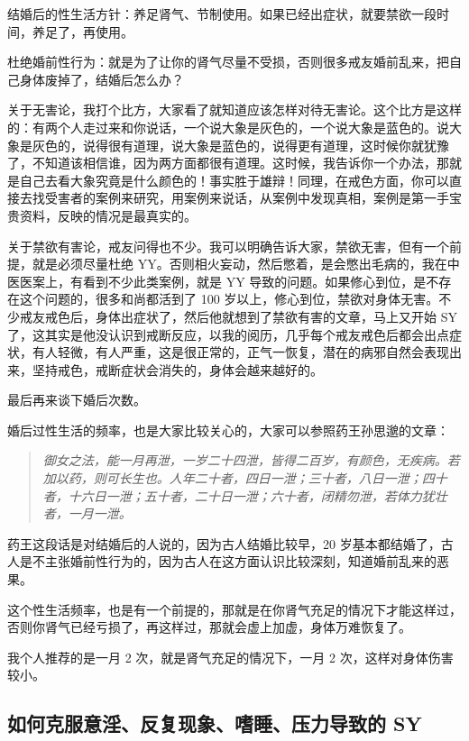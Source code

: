 \documentclass{ctexart}
\begin{document}
结婚后的性生活方针：养足肾气、节制使用。如果已经出症状，就要禁欲一段时间，养足了，再使用。

杜绝婚前性行为：就是为了让你的肾气尽量不受损，否则很多戒友婚前乱来，把自己身体废掉了，结婚后怎么办？

关于无害论，我打个比方，大家看了就知道应该怎样对待无害论。这个比方是这样的：有两个人走过来和你说话，一个说大象是灰色的，一个说大象是蓝色的。说大象是灰色的，说得很有道理，说大象是蓝色的，说得更有道理，这时候你就犹豫了，不知道该相信谁，因为两方面都很有道理。这时候，我告诉你一个办法，那就是自己去看大象究竟是什么颜色的！事实胜于雄辩！同理，在戒色方面，你可以直接去找受害者的案例来研究，用案例来说话，从案例中发现真相，案例是第一手宝贵资料，反映的情况是最真实的。

关于禁欲有害论，戒友问得也不少。我可以明确告诉大家，禁欲无害，但有一个前提，就是必须尽量杜绝 YY。否则相火妄动，然后憋着，是会憋出毛病的，我在中医医案上，有看到不少此类案例，就是 YY 导致的问题。如果修心到位，是不存在这个问题的，很多和尚都活到了 100 岁以上，修心到位，禁欲对身体无害。不少戒友戒色后，身体出症状了，然后他就想到了禁欲有害的文章，马上又开始 SY 了，这其实是他没认识到戒断反应，以我的阅历，几乎每个戒友戒色后都会出点症状，有人轻微，有人严重，这是很正常的，正气一恢复，潜在的病邪自然会表现出来，坚持戒色，戒断症状会消失的，身体会越来越好的。

最后再来谈下婚后次数。

婚后过性生活的频率，也是大家比较关心的，大家可以参照药王孙思邈的文章：

\begin{quote}\it
    御女之法，能一月再泄，一岁二十四泄，皆得二百岁，有颜色，无疾病。若加以药，则可长生也。人年二十者，四日一泄；三十者，八日一泄；四十者，十六日一泄；五十者，二十日一泄；六十者，闭精勿泄，若体力犹壮者，一月一泄。
\end{quote}

药王这段话是对结婚后的人说的，因为古人结婚比较早，20 岁基本都结婚了，古人是不主张婚前性行为的，因为古人在这方面认识比较深刻，知道婚前乱来的恶果。

这个性生活频率，也是有一个前提的，那就是在你肾气充足的情况下才能这样过，否则你肾气已经亏损了，再这样过，那就会虚上加虚，身体万难恢复了。

我个人推荐的是一月 2 次，就是肾气充足的情况下，一月 2 次，这样对身体伤害较小。

\subsection{如何克服意淫、反复现象、嗜睡、压力导致的 SY}
\end{document}
